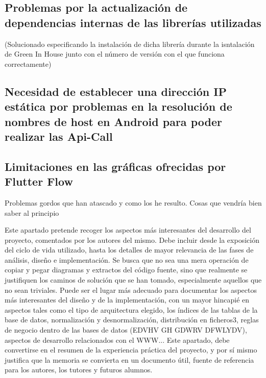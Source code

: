     
    
    \subsection{Problemas por la actualización de dependencias internas de las librerías utilizadas}
    (Solucionado especificando la instalación de dicha librería durante la isntalación de Green In House junto con el número de versión con el que funciona correctamente)
    
    
    \subsection{Necesidad de establecer una dirección IP estática por problemas en la resolución de nombres de host en Android para poder realizar las Api-Call}
    
    
    \subsection{Limitaciones en las gráficas ofrecidas por Flutter Flow}
    




Problemas gordos que han atascado y como los he resulto.
Cosas que vendría bien saber al principio

Este apartado pretende recoger los aspectos más interesantes del desarrollo del proyecto, comentados por los autores del mismo.
Debe incluir desde la exposición del ciclo de vida utilizado, hasta los detalles de mayor relevancia de las fases de análisis, diseño e implementación.
Se busca que no sea una mera operación de copiar y pegar diagramas y extractos del código fuente, sino que realmente se justifiquen los caminos de solución que se han tomado, especialmente aquellos que no sean triviales.
Puede ser el lugar más adecuado para documentar los aspectos más interesantes del diseño y de la implementación, con un mayor hincapié en aspectos tales como el tipo de arquitectura elegido, los índices de las tablas de la base de datos, normalización y desnormalización, distribución en ficheros3, reglas de negocio dentro de las bases de datos (EDVHV GH GDWRV DFWLYDV), aspectos de desarrollo relacionados con el WWW...
Este apartado, debe convertirse en el resumen de la experiencia práctica del proyecto, y por sí mismo justifica que la memoria se convierta en un documento útil, fuente de referencia para los autores, los tutores y futuros alumnos.
